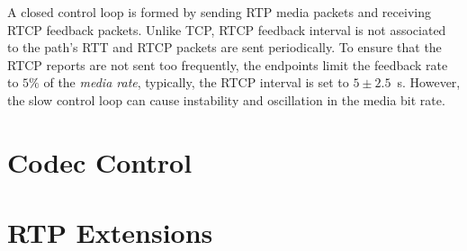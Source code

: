 A closed control loop is formed by sending RTP media packets and receiving
RTCP feedback packets. Unlike TCP, RTCP feedback interval is not associated to
the path's RTT and RTCP packets are sent periodically. To ensure that the RTCP
reports are not sent too frequently, the endpoints limit the feedback rate to
$5\%$ of the \textit{media rate}, typically, the RTCP interval is set to $5
\pm 2.5$~s. However, the slow control loop can cause instability and
oscillation in the media bit rate.



\section{Codec Control}

\section{RTP Extensions}
\label{rtp.ext}

